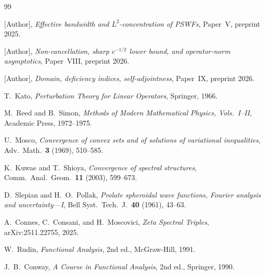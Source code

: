 \documentclass[12pt,a4paper]{amsart}
\theoremstyle{definition}
\theoremstyle{remark}
\begin{document}
\begin{thebibliography}{99}

[Author],
\textit{Effective bandwidth and
$L^2$-concentration of PSWFs},
Paper~V, preprint 2025.

[Author],
\textit{Non-cancellation, sharp
$c^{-1/2}$ lower bound,
and operator-norm asymptotics},
Paper~VIII, preprint 2026.

[Author],
\textit{Domain, deficiency indices,
self-adjointness},
Paper~IX, preprint 2026.

T.~Kato,
\textit{Perturbation Theory for
Linear Operators},
Springer, 1966.

M.~Reed and B.~Simon,
\textit{Methods of Modern
Mathematical Physics, Vols.~I--II},
Academic Press, 1972--1975.

U.~Mosco,
\textit{Convergence of convex sets
and of solutions of variational
inequalities},
Adv.\ Math.\ \textbf{3} (1969),
510--585.

K.~Kuwae and T.~Shioya,
\textit{Convergence of spectral
structures},
Comm.\ Anal.\ Geom.\ \textbf{11}
(2003), 599--673.

D.~Slepian and H.~O.~Pollak,
\textit{Prolate spheroidal wave
functions, Fourier analysis
and uncertainty---I},
Bell Syst.\ Tech.\ J.\
\textbf{40} (1961), 43--63.

A.~Connes, C.~Consani,
and H.~Moscovici,
\textit{Zeta Spectral Triples},
arXiv:2511.22755, 2025.

W.~Rudin,
\textit{Functional Analysis},
2nd ed., McGraw-Hill, 1991.

J.~B.~Conway,
\textit{A Course in Functional
Analysis},
2nd ed., Springer, 1990.

\end{thebibliography}
\end{document}

